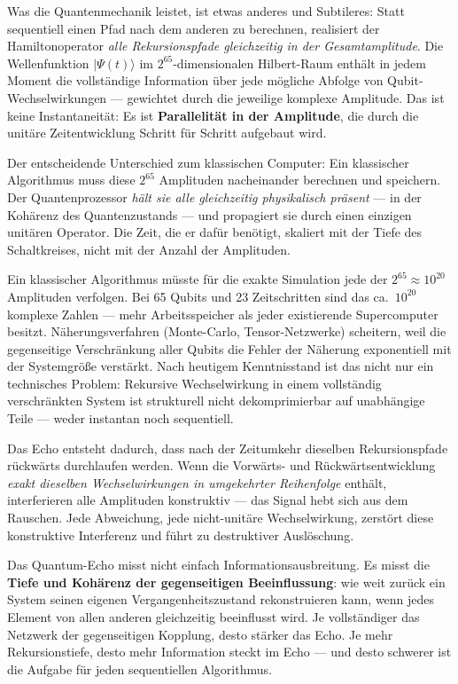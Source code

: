 Was die Quantenmechanik leistet, ist etwas anderes und Subtileres: Statt
sequentiell einen Pfad nach dem anderen zu berechnen, realisiert der Hamiltonoperator
\emph{alle Rekursionspfade gleichzeitig in der Gesamtamplitude}. Die
Wellenfunktion $|\Psi(t)\rangle$ im $2^{65}$-dimensionalen Hilbert-Raum enthält
in jedem Moment die vollständige Information über jede mögliche Abfolge von
Qubit-Wechselwirkungen — gewichtet durch die jeweilige komplexe Amplitude.
Das ist keine Instantaneität: Es ist \textbf{Parallelität in der Amplitude},
die durch die unitäre Zeitentwicklung Schritt für Schritt aufgebaut wird.

Der entscheidende Unterschied zum klassischen Computer:
Ein klassischer Algorithmus muss diese $2^{65}$ Amplituden nacheinander berechnen
und speichern. Der Quantenprozessor \emph{hält sie alle gleichzeitig physikalisch
präsent} — in der Kohärenz des Quantenzustands — und propagiert sie durch einen
einzigen unitären Operator. Die Zeit, die er dafür benötigt, skaliert mit der
Tiefe des Schaltkreises, nicht mit der Anzahl der Amplituden.

\begin{technical}
Ein klassischer Algorithmus müsste für die exakte Simulation jede der $2^{65}
\approx 10^{20}$ Amplituden verfolgen. Bei 65 Qubits und 23 Zeitschritten
sind das ca.\ $10^{20}$ komplexe Zahlen — mehr Arbeitsspeicher als jeder
existierende Supercomputer besitzt. Näherungsverfahren (Monte-Carlo,
Tensor-Netzwerke) scheitern, weil die gegenseitige Verschränkung aller Qubits
die Fehler der Näherung exponentiell mit der Systemgröße verstärkt.
Nach heutigem Kenntnisstand ist das nicht nur ein technisches Problem: Rekursive
Wechselwirkung in einem vollständig verschränkten System ist strukturell
nicht dekomprimierbar auf unabhängige Teile — weder instantan noch sequentiell.
\end{technical}

Das Echo entsteht dadurch, dass nach der Zeitumkehr dieselben Rekursionspfade
rückwärts durchlaufen werden. Wenn die Vorwärts- und Rückwärtsentwicklung
\emph{exakt dieselben Wechselwirkungen in umgekehrter Reihenfolge} enthält,
interferieren alle Amplituden konstruktiv — das Signal hebt sich aus dem Rauschen.
Jede Abweichung, jede nicht-unitäre Wechselwirkung, zerstört diese konstruktive
Interferenz und führt zu destruktiver Auslöschung.

\begin{keypoint}
Das Quantum-Echo misst nicht einfach Informationsausbreitung. Es misst die
\textbf{Tiefe und Kohärenz der gegenseitigen Beeinflussung}: wie weit zurück
ein System seinen eigenen Vergangenheitszustand rekonstruieren kann, wenn jedes
Element von allen anderen gleichzeitig beeinflusst wird.
Je vollständiger das Netzwerk der gegenseitigen Kopplung, desto stärker das Echo.
Je mehr Rekursionstiefe, desto mehr Information steckt im Echo — und desto
schwerer ist die Aufgabe für jeden sequentiellen Algorithmus.
\end{keypoint}


